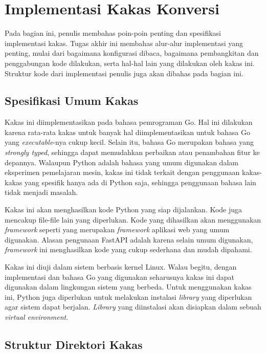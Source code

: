 \section{Implementasi Kakas Konversi}

Pada bagian ini, penulis membahas poin-poin penting dan spesifikasi implementasi kakas.
Tugas akhir ini membahas alur-alur implementasi yang penting, mulai dari bagaimana konfigurasi dibaca, bagaimana pembangkitan dan penggabungan kode dilakukan, serta hal-hal lain yang dilakukan oleh kakas ini.
Struktur kode dari implementasi penulis juga akan dibahas pada bagian ini.

\subsection{Spesifikasi Umum Kakas}

Kakas ini diimplementasikan pada bahasa pemrograman Go.
Hal ini dilakukan karena rata-rata kakas untuk banyak hal diimplementasikan untuk bahasa Go yang \textit{executable}-nya cukup kecil.
Selain itu, bahasa Go merupakan bahasa yang \textit{strongly typed}, sehingga dapat memudahkan perbaikan atau penambahan fitur ke depannya.
Walaupun Python adalah bahasa yang umum digunakan dalam eksperimen pemelajaran mesin, kakas ini tidak terkait dengan penggunaan kakas-kakas yang spesifik hanya ada di Python saja, sehingga penggunaan bahasa lain tidak menjadi masalah.

Kakas ini akan menghasilkan kode Python yang siap dijalankan.
Kode juga mencakup file-file lain yang diperlukan.
Kode yang dihasilkan akan menggunakan \textit{framework} seperti  yang merupakan \textit{framework} aplikasi web yang umum digunakan.
Alasan pengunaan FastAPI adalah karena selain umum digunakan, \textit{framework} ini menghasilkan kode yang cukup sederhana dan mudah dipahami.

Kakas ini diuji dalam sistem berbasis kernel Linux.
Walau begitu, dengan implementasi dan bahasa Go yang digunakan seharusnya kakas ini dapat digunakan dalam lingkungan sistem yang berbeda.
Untuk menggunakan kakas ini, Python juga diperlukan untuk melakukan instalasi \textit{library} yang diperlukan agar sistem dapat berjalan.
\textit{Library} yang diinstalasi akan disiapkan dalam sebuah \textit{virtual environment}.

\subsection{Struktur Direktori Kakas}

